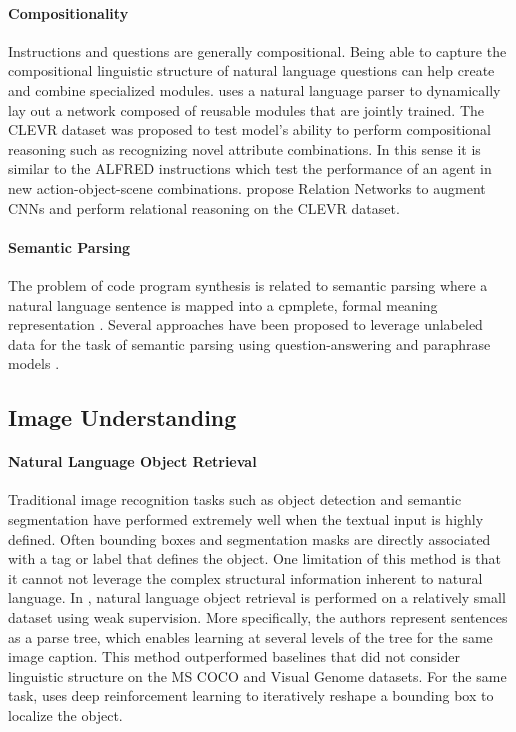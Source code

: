 \documentclass[11pt,a4paper]{article}
\begin{document}
\paragraph{Compositionality} Instructions and questions are generally compositional. Being able to capture the compositional linguistic structure of natural language questions can help create and combine specialized modules. 
\citet{andreas2016neural} uses a natural language parser to dynamically lay out a network composed of reusable modules that are jointly trained. The CLEVR dataset \citep{johnson2017clevr} was proposed to test model's ability to perform compositional reasoning such as recognizing novel attribute combinations. In this sense it is similar to the ALFRED \citet{ALFRED20} instructions which test the performance of an agent in new action-object-scene combinations. \citet{santoro2017simple} propose Relation Networks to augment CNNs and perform relational reasoning on the CLEVR dataset.


\paragraph{Semantic Parsing} The problem of code program synthesis is related to semantic parsing where a natural language sentence is mapped into a cpmplete, formal meaning representation \citep{mooney2007learning}. Several approaches have been proposed to leverage unlabeled data for the task of semantic parsing using question-answering and paraphrase models
\citep{berant2013semantic, berant2014semantic} .

\subsection{Image Understanding}

\paragraph{Natural Language Object Retrieval}
Traditional image recognition tasks such as object detection and semantic segmentation have performed extremely well when the textual input is highly defined. Often bounding boxes and segmentation masks are directly associated with a tag or label that defines the object. One limitation of this method is that it cannot not leverage the complex structural information inherent to natural language. In \cite{vis_grounding}, natural language object retrieval is performed on a relatively small dataset using weak supervision. More specifically, the authors represent sentences as a parse tree, which enables learning at several levels of the tree for the same image caption. This method outperformed baselines that did not consider linguistic structure on the MS COCO and Visual Genome datasets. For the same task, \citep{end_to_end_approach} uses deep reinforcement learning to iteratively reshape a bounding box to localize the object. 
\end{document}
